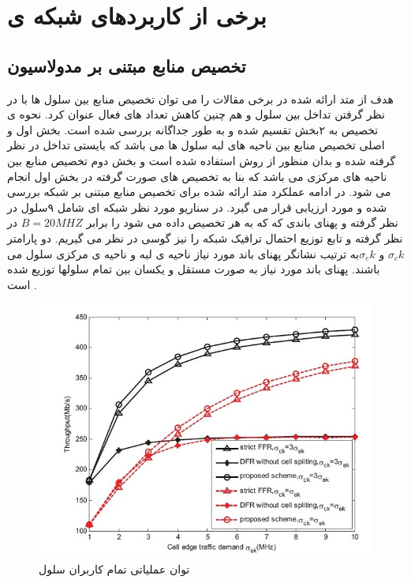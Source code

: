  \section{برخی از کاربردهای شبکه ی   }

\subsection{ تخصیص منابع مبتنی بر مدولاسیون }
هدف از متد ارائه شده در برخی مقالات را می توان تخصیص
منابع بین سلول ها با در نظر گرفتن تداخل بین سلول و هم
چنین کاهش تعداد  های فعال عنوان کرد. نحوه ی
تخصیص به  ۲بخش تقسیم شده و به طور جداگانه بررسی
شده است. بخش اول و اصلی تخصیص منابع بین ناحیه
های لبه سلول ها می باشد که بایستی تداخل در نظر گرفته
شده و بدان منظور از روش  استفاده شده
است و بخش دوم تخصیص منابع بین ناحیه های مرکزی
می باشد که بنا به تخصیص های صورت گرفته در بخش
اول انجام می شود. در ادامه عملکرد متد ارائه شده برای
تخصیص منابع مبتنی بر شبکه  بررسی شده و مورد
ارزیابی قرار می گیرد.
در سناریو مورد نظر شبکه ای شامل  ۹سلول در نظر گرفته
و پهنای باندی که که به هر  تخصیص داده می
شود را برابر $ B = 20MHZ$ در نظر گرفته و تابع توزیع
احتمال ترافیک شبکه را نیز گوسی در نظر می گیریم. دو
پارامتر $\sigma_ck$ و $\sigma_ek$به ترتیب نشانگر پهنای باند مورد نیاز ناحیه
ی لبه و ناحیه ی مرکزی سلول  می باشند. پهنای باند
مورد نیاز به صورت مستقل و یکسان بین تمام سلولها توزیع
شده است .\cite{graph}
\begin{figure}
  \centering
    \includegraphics[scale =0.7]{./pic1/cr}
  \caption{ توان عملیاتی تمام کاربران سلول \cite{graph} }
  \label{fig:cr}
\end{figure}
